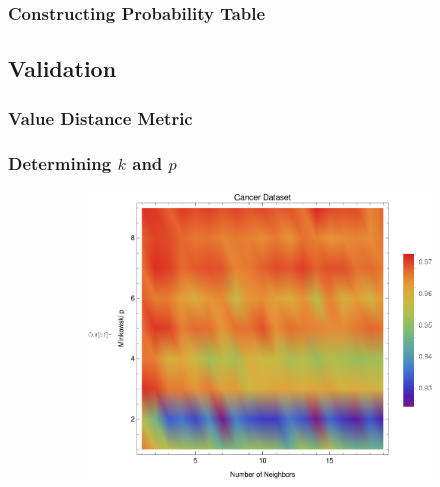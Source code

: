 \documentclass{article}
\begin{document}
		\subsubsection{Constructing Probability Table}
	\subsection{Validation}
		\subsubsection{Value Distance Metric}
		\subsubsection{Determining $k$ and $p$}
		
			\begin{figure}[h!]
				\centering
				\begin{subfigure}[b]{0.32\textwidth}
					\centering
					\includegraphics[width=\textwidth]{figs/kNN/cancer_plot_kp}	
					\caption{}
					\label{kp_cancer}				
				\end{subfigure}	\	
				\begin{subfigure}[b]{0.32\textwidth}
					\centering

\end{subfigure}
\end{figure}
\end{document}
